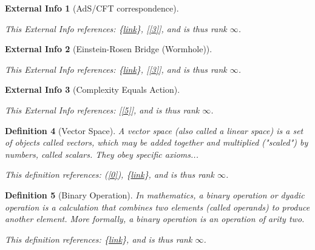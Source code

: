 \documentclass{article}
\newtheorem{definition}{Definition}
\newtheorem{External Info}[definition]{External Info}
\begin{document}
\begin{tcolorbox}[title=External Info: AdS/CFT correspondence]\begin{External Info}[AdS/CFT correspondence]\label{15}
 
 This External Info references: \{\href{https://en.wikipedia.org/wiki/AdS/CFT_correspondence}{link}\}, [\ref{3}], and is thus rank $\infty$.\end{External Info}\end{tcolorbox}
\begin{tcolorbox}[title=External Info: Einstein-Rosen Bridge (Wormhole)]\begin{External Info}[Einstein-Rosen Bridge (Wormhole)]\label{16}
 
 This External Info references: \{\href{https://en.wikipedia.org/wiki/Wormhole}{link}\}, [\ref{3}], and is thus rank $\infty$.\end{External Info}\end{tcolorbox}
\begin{tcolorbox}[title=External Info: Complexity Equals Action]\begin{External Info}[Complexity Equals Action]\label{17}
 
 This External Info references: [\ref{5}], and is thus rank $\infty$.\end{External Info}\end{tcolorbox}
\begin{tcolorbox}[title=Definition: Vector Space]\begin{definition}[Vector Space]\label{18}A vector space (also called a linear space) is a set of objects called vectors, which may be added together and multiplied ("scaled") by numbers, called scalars. They obey specific axioms...
 
 This definition references: (\ref{0}), \{\href{https://en.wikipedia.org/wiki/Vector_space}{link}\}, and is thus rank $\infty$.\end{definition}\end{tcolorbox}
\begin{tcolorbox}[title=Definition: Binary Operation]\begin{definition}[Binary Operation]\label{19}In mathematics, a binary operation or dyadic operation is a calculation that combines two elements (called operands) to produce another element. More formally, a binary operation is an operation of arity two.
 
 This definition references: \{\href{https://en.wikipedia.org/wiki/Binary_operation}{link}\}, and is thus rank $\infty$.\end{definition}\end{tcolorbox}
\end{document}

